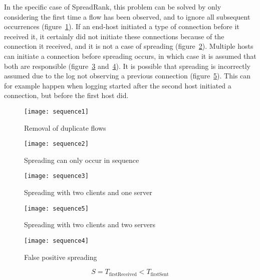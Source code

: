 In the specific case of SpreadRank, this problem can be solved by only considering the first time a flow has been observed,
 and to ignore all subsequent occurrences (figure~\ref{fig:sequence1}).
If an end-host initiated a type of connection before it received it, it certainly did not initiate these connections because of the connection it received,
 and it is not a case of spreading (figure~\ref{fig:sequence2}).
Multiple hosts can initiate a connection before spreading occurs, in which case it is assumed that both are responsible (figure~\ref{fig:sequence3} and~\ref{fig:sequence5}).
It is possible that spreading is incorrectly assumed due to the log not observing a previous connection (figure~\ref{fig:sequence4}).
This can for example happen when logging started after the second host initiated a connection, but before the first host did.

\begin{figure}[h!]
	\caption{Removal of duplicate flows}
	\label{fig:sequence1}
	\centering
		\texttt{[image: sequence1]}
\end{figure}
\begin{figure}[h!]
	\caption{Spreading can only occur in sequence}
	\label{fig:sequence2}
	\centering
		\texttt{[image: sequence2]}
\end{figure}
\begin{figure}[h!]
	\caption{Spreading with two clients and one server}
	\label{fig:sequence3}
	\centering
		\texttt{[image: sequence3]}
\end{figure}
\begin{figure}[h!]
	\caption{Spreading with two clients and two servers}
	\label{fig:sequence5}
	\centering
		\texttt{[image: sequence5]}
\end{figure}
\begin{figure}[h!]
	\caption{False positive spreading}
	\label{fig:sequence4}
	\centering
		\texttt{[image: sequence4]}
\end{figure}

\begin{equation}
	\label{eq:spreading}
	S = T_{\text{firstReceived}} < T_{\text{firstSent}}
\end{equation}


